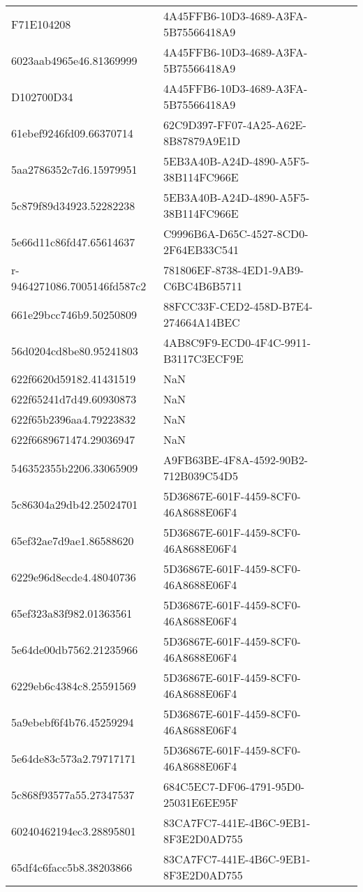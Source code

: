 \begin{tabular}{ll}
F71E104208 & 4A45FFB6-10D3-4689-A3FA-5B75566418A9 \\
6023aab4965e46.81369999 & 4A45FFB6-10D3-4689-A3FA-5B75566418A9 \\
D102700D34 & 4A45FFB6-10D3-4689-A3FA-5B75566418A9 \\
61ebef9246fd09.66370714 & 62C9D397-FF07-4A25-A62E-8B87879A9E1D \\
5aa2786352c7d6.15979951 & 5EB3A40B-A24D-4890-A5F5-38B114FC966E \\
5c879f89d34923.52282238 & 5EB3A40B-A24D-4890-A5F5-38B114FC966E \\
5e66d11c86fd47.65614637 & C9996B6A-D65C-4527-8CD0-2F64EB33C541 \\
r-9464271086.7005146fd587c2 & 781806EF-8738-4ED1-9AB9-C6BC4B6B5711 \\
661e29bcc746b9.50250809 & 88FCC33F-CED2-458D-B7E4-274664A14BEC \\
56d0204cd8be80.95241803 & 4AB8C9F9-ECD0-4F4C-9911-B3117C3ECF9E \\
622f6620d59182.41431519 & NaN \\
622f65241d7d49.60930873 & NaN \\
622f65b2396aa4.79223832 & NaN \\
622f6689671474.29036947 & NaN \\
546352355b2206.33065909 & A9FB63BE-4F8A-4592-90B2-712B039C54D5 \\
5c86304a29db42.25024701 & 5D36867E-601F-4459-8CF0-46A8688E06F4 \\
65ef32ae7d9ae1.86588620 & 5D36867E-601F-4459-8CF0-46A8688E06F4 \\
6229e96d8ecde4.48040736 & 5D36867E-601F-4459-8CF0-46A8688E06F4 \\
65ef323a83f982.01363561 & 5D36867E-601F-4459-8CF0-46A8688E06F4 \\
5e64de00db7562.21235966 & 5D36867E-601F-4459-8CF0-46A8688E06F4 \\
6229eb6c4384c8.25591569 & 5D36867E-601F-4459-8CF0-46A8688E06F4 \\
5a9ebebf6f4b76.45259294 & 5D36867E-601F-4459-8CF0-46A8688E06F4 \\
5e64de83c573a2.79717171 & 5D36867E-601F-4459-8CF0-46A8688E06F4 \\
5c868f93577a55.27347537 & 684C5EC7-DF06-4791-95D0-25031E6EE95F \\
60240462194ec3.28895801 & 83CA7FC7-441E-4B6C-9EB1-8F3E2D0AD755 \\
65df4c6facc5b8.38203866 & 83CA7FC7-441E-4B6C-9EB1-8F3E2D0AD755 \\

\end{tabular}

